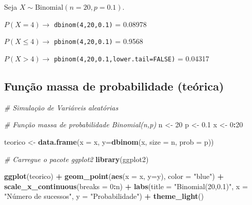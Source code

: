 \documentclass[
]{book}
\newenvironment{Shaded}{\begin{snugshade}}{\end{snugshade}}
\newcommand{\AttributeTok}[1]{\textcolor[rgb]{0.13,0.29,0.53}{#1}}
\newcommand{\CommentTok}[1]{\textcolor[rgb]{0.56,0.35,0.01}{\textit{#1}}}
\newcommand{\DecValTok}[1]{\textcolor[rgb]{0.00,0.00,0.81}{#1}}
\newcommand{\FloatTok}[1]{\textcolor[rgb]{0.00,0.00,0.81}{#1}}
\newcommand{\FunctionTok}[1]{\textcolor[rgb]{0.13,0.29,0.53}{\textbf{#1}}}
\newcommand{\NormalTok}[1]{#1}
\newcommand{\OtherTok}[1]{\textcolor[rgb]{0.56,0.35,0.01}{#1}}
\newcommand{\SpecialCharTok}[1]{\textcolor[rgb]{0.81,0.36,0.00}{\textbf{#1}}}
\newcommand{\StringTok}[1]{\textcolor[rgb]{0.31,0.60,0.02}{#1}}
\begin{document}
Seja \(X\sim \text{Binomial}(n=20,p=0.1)\).

\(P(X = 4) \to\) \texttt{dbinom(4,20,0.1)} = 0.08978

\(P(X \leq 4) \to\) \texttt{pbinom(4,20,0.1)} = 0.9568

\(P(X > 4)\to\) \texttt{pbinom(4,20,0.1,lower.tail=FALSE)} = 0.04317

\subsection{Função massa de probabilidade (teórica)}\label{funuxe7uxe3o-massa-de-probabilidade-teuxf3rica}

\begin{Shaded}
\begin{Highlighting}[]
\CommentTok{\# Simulação de Variáveis aleatórias}

\CommentTok{\# Função massa de probabilidade Binomial(n,p)}
\NormalTok{n }\OtherTok{\textless{}{-}} \DecValTok{20}
\NormalTok{p }\OtherTok{\textless{}{-}} \FloatTok{0.1}
\NormalTok{x }\OtherTok{\textless{}{-}} \DecValTok{0}\SpecialCharTok{:}\DecValTok{20}

\NormalTok{teorico }\OtherTok{\textless{}{-}} \FunctionTok{data.frame}\NormalTok{(}\AttributeTok{x =}\NormalTok{ x, }\AttributeTok{y=}\FunctionTok{dbinom}\NormalTok{(x, }\AttributeTok{size =}\NormalTok{ n, }\AttributeTok{prob =}\NormalTok{ p))}

\CommentTok{\# Carregue o pacote ggplot2}
\FunctionTok{library}\NormalTok{(ggplot2)}

\FunctionTok{ggplot}\NormalTok{(teorico) }\SpecialCharTok{+}  
  \FunctionTok{geom\_point}\NormalTok{(}\FunctionTok{aes}\NormalTok{(}\AttributeTok{x =}\NormalTok{ x, }\AttributeTok{y=}\NormalTok{y), }\AttributeTok{color =} \StringTok{"blue"}\NormalTok{) }\SpecialCharTok{+} 
  \FunctionTok{scale\_x\_continuous}\NormalTok{(}\AttributeTok{breaks =} \DecValTok{0}\SpecialCharTok{:}\NormalTok{n) }\SpecialCharTok{+}  
  \FunctionTok{labs}\NormalTok{(}\AttributeTok{title =} \StringTok{"Binomial(20,0.1)"}\NormalTok{, }\AttributeTok{x =} \StringTok{"Número de sucessos"}\NormalTok{, }\AttributeTok{y =} \StringTok{"Probabilidade"}\NormalTok{) }\SpecialCharTok{+}  
  \FunctionTok{theme\_light}\NormalTok{()}
\end{Highlighting}
\end{Shaded}
\end{document}
